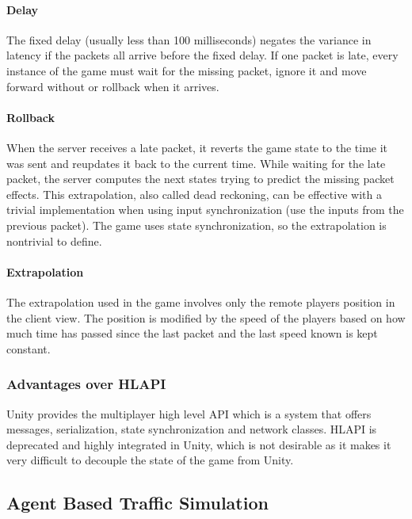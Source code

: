 \documentclass[12pt]{article}
\begin{document}
\paragraph{Delay}
The fixed delay (usually less than 100 milliseconds) negates the variance in latency if the packets all arrive before the fixed delay. If one packet is late, every instance of the game must wait for the missing packet, ignore it and move forward without or rollback when it arrives.

\paragraph{Rollback}
When the server receives a late packet, it reverts the game state to the time it was sent and reupdates it back to the current time. While waiting for the late packet, the server computes the next states trying to predict the missing packet effects. This extrapolation, also called dead reckoning, can be effective with a trivial implementation when using input synchronization (use the inputs from the previous packet). The game uses state synchronization, so the extrapolation is nontrivial to define.

\paragraph{Extrapolation}
The extrapolation used in the game involves only the remote players position in the client view. The position is modified by the speed of the players based on how much time has passed since the last packet and the last speed known is kept constant.

\subsubsection{Advantages over HLAPI \cite{hlapi}}
Unity provides the multiplayer high level API which is a system that offers messages, serialization, state synchronization and network classes. HLAPI is deprecated and highly integrated in Unity, which is not desirable as it makes it very difficult to decouple the state of the game from Unity.

\clearpage

\subsection{Agent Based Traffic Simulation}
\end{document}

